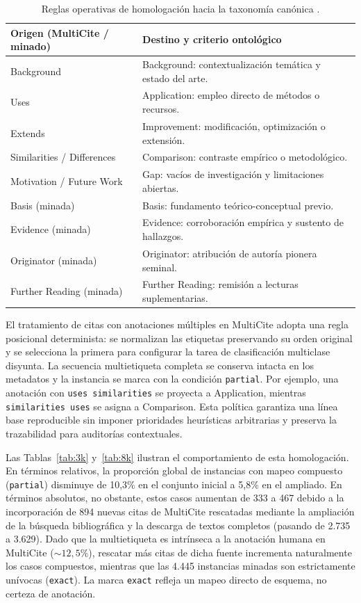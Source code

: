 \documentclass[10pt,a4paper,twocolumn]{article}
\begin{document}
\begin{table}[t]
\centering\small
\caption{Reglas operativas de homologación hacia la taxonomía canónica \cite{Lyu2021}.}\label{tab:mapeo}
\begin{tabularx}{\columnwidth}{@{}>{\raggedright\arraybackslash}p{2.6cm}Y@{}}\toprule
Origen (MultiCite / minado) & Destino y criterio ontológico\\\midrule
Background & Background: contextualización temática y estado del arte.\\
Uses & Application: empleo directo de métodos o recursos.\\
Extends & Improvement: modificación, optimización o extensión.\\
Similarities / Differences & Comparison: contraste empírico o metodológico.\\
Motivation / Future Work & Gap: vacíos de investigación y limitaciones abiertas.\\
Basis (minada) & Basis: fundamento teórico-conceptual previo.\\
Evidence (minada) & Evidence: corroboración empírica y sustento de hallazgos.\\
Originator (minada) & Originator: atribución de autoría pionera seminal.\\
Further Reading (minada) & Further Reading: remisión a lecturas suplementarias.\\\bottomrule
\end{tabularx}
\end{table}

El tratamiento de citas con anotaciones múltiples en MultiCite adopta una regla posicional determinista: se normalizan las etiquetas preservando su orden original y se selecciona la primera para configurar la tarea de clasificación multiclase disyunta. La secuencia multietiqueta completa se conserva intacta en los metadatos y la instancia se marca con la condición \texttt{partial}. Por ejemplo, una anotación con \texttt{uses similarities} se proyecta a Application, mientras \texttt{similarities uses} se asigna a Comparison. Esta política garantiza una línea base reproducible sin imponer prioridades heurísticas arbitrarias y preserva la trazabilidad para auditorías contextuales.

Las Tablas~\ref{tab:3k} y~\ref{tab:8k} ilustran el comportamiento de esta homologación. En términos relativos, la proporción global de instancias con mapeo compuesto (\texttt{partial}) disminuye de 10,3\% en el conjunto inicial a 5,8\% en el ampliado. En términos absolutos, no obstante, estos casos aumentan de 333 a 467 debido a la incorporación de 894 nuevas citas de MultiCite rescatadas mediante la ampliación de la búsqueda bibliográfica y la descarga de textos completos (pasando de 2.735 a 3.629). Dado que la multietiqueta es intrínseca a la anotación humana en MultiCite ($\sim 12,5\%$), rescatar más citas de dicha fuente incrementa naturalmente los casos compuestos, mientras que las 4.445 instancias minadas son estrictamente unívocas (\texttt{exact}). La marca \texttt{exact} refleja un mapeo directo de esquema, no certeza de anotación.
\end{document}
